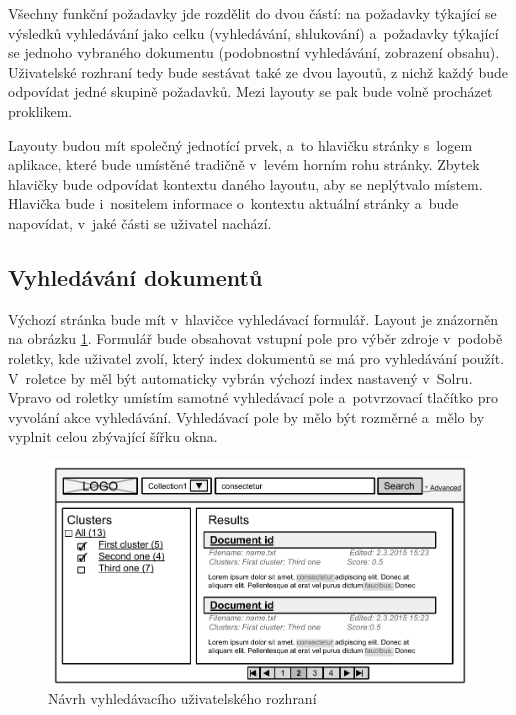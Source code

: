 Všechny funkční požadavky jde rozdělit do dvou částí: na požadavky týkající se výsledků vyhledávání jako celku (vyhledávání, shlukování) a~požadavky týkající se jednoho vybraného dokumentu (podobnostní vyhledávání, zobrazení obsahu). Uživatelské rozhraní tedy bude sestávat také ze dvou layoutů, z nichž každý bude odpovídat jedné skupině požadavků. Mezi layouty se pak bude volně procházet proklikem. 

Layouty budou mít společný jednotící prvek, a~to hlavičku stránky s~logem aplikace, které bude umístěné tradičně v~levém horním rohu stránky. Zbytek hlavičky bude odpovídat kontextu daného layoutu, aby se neplýtvalo místem. Hlavička bude i~nositelem informace o~kontextu aktuální stránky a~bude napovídat, v~jaké části se uživatel nachází.

\subsection{Vyhledávání dokumentů}
Výchozí stránka bude mít v~hlavičce vyhledávací formulář. Layout je znázorněn na obrázku \ref{fig:SearchLayout}. Formulář bude obsahovat vstupní pole pro výběr zdroje v~podobě roletky, kde uživatel zvolí, který index dokumentů se má pro vyhledávání použít. V~roletce by měl být automaticky vybrán výchozí index nastavený v~Solru. Vpravo od roletky umístím samotné vyhledávací pole a~potvrzovací tlačítko pro vyvolání akce vyhledávání. Vyhledávací pole by mělo být rozměrné a~mělo by vyplnit celou zbývající šířku okna.

\begin{figure}[h]
\begin{center}
\includegraphics[width=13cm]{SearchLayout}
\caption{Návrh vyhledávacího uživatelského rozhraní}
\label{fig:SearchLayout}
\end{center}
\end{figure}

